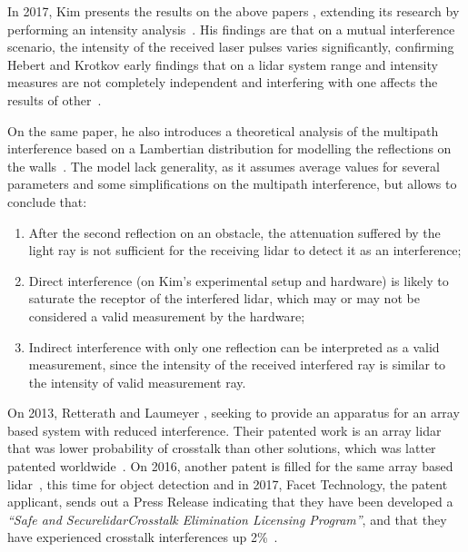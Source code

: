 

In 2017, Kim \etal presents the results on the above papers \cite{Kim2015a, Kim2015b, Kim2015c}, extending its research by performing an intensity analysis~\cite{Kim2017}. His findings are that on a mutual interference scenario, the intensity of the received laser pulses varies significantly, confirming Hebert and Krotkov early findings that on a \ac{lidar} system range and intensity measures are not completely independent and interfering with one affects the results of other~\cite{Hebert}.

On the same paper, he also introduces a theoretical analysis of the multipath interference based on a Lambertian distribution for modelling the reflections on the walls~\cite{Kim2017}. The model lack generality, as it assumes average values for several parameters and some simplifications on the multipath interference, but allows to conclude that:

\begin{enumerate}
	\item After the second reflection on an obstacle, the attenuation suffered by the light ray is not sufficient for the receiving \ac{lidar} to detect it as an interference;
	\item Direct interference (on Kim's experimental setup and hardware) is likely to saturate the receptor of the interfered \ac{lidar}, which may or may not be considered a valid measurement by the hardware;
	\item Indirect interference with only one reflection can be interpreted as a valid measurement, since the intensity of the received interfered ray is similar to the intensity of valid measurement ray.
\end{enumerate}

On 2013, Retterath and Laumeyer \cite{Retterath2015}, seeking to provide an apparatus for an array based system with reduced interference. Their patented work is an array \ac{lidar} that was lower probability of crosstalk than other solutions, which was latter patented worldwide~\cite{Retterath2015WO}. On 2016, another patent is filled for the same array based \ac{lidar}~\cite{Retterath2016}, this time for object detection and in 2017, Facet Technology, the patent applicant, sends out a Press Release indicating that they have been developed a \textit{``Safe and Secure\acs{lidar}\textregistered Crosstalk Elimination Licensing Program''}, and that they have experienced crosstalk interferences up 2\%~\cite{Facet}.

